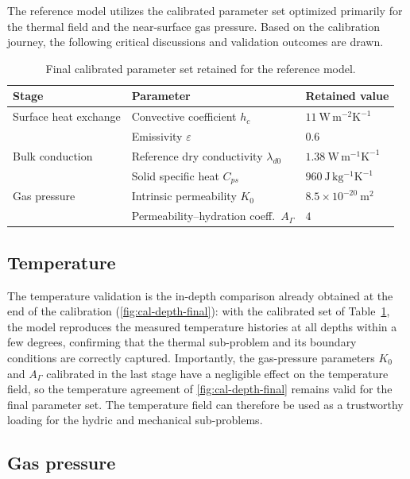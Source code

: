 The reference model utilizes the calibrated parameter set optimized primarily for the thermal field and the near-surface gas pressure. Based on the calibration journey, the following critical discussions and validation outcomes are drawn.

\begin{table}[H]
  \centering
  \caption{Final calibrated parameter set retained for the reference model.}
  \label{tab:calibrated}
  \begin{tabular}{lll}
    \hline
    Stage & Parameter & Retained value \\
    \hline
    Surface heat exchange & Convective coefficient $h_c$        & $11~\mathrm{W\,m^{-2}K^{-1}}$ \\
                          & Emissivity $\varepsilon$            & $0.6$ \\
    Bulk conduction       & Reference dry conductivity $\lambda_{d0}$ & $1.38~\mathrm{W\,m^{-1}K^{-1}}$ \\
                          & Solid specific heat $C_{ps}$        & $960~\mathrm{J\,kg^{-1}K^{-1}}$ \\
    Gas pressure          & Intrinsic permeability $K_0$        & $8.5\times10^{-20}~\mathrm{m^2}$ \\
                          & Permeability--hydration coeff.\ $A_\Gamma$ & $4$ \\
    \hline
  \end{tabular}
\end{table}


\subsection{Temperature} \label{sec:val-temp}
The temperature validation is the in-depth comparison already obtained at the end of the calibration (\cref{fig:cal-depth-final}): with the calibrated set of Table~\ref{tab:calibrated}, the model reproduces the measured temperature histories at all depths within a few degrees, confirming that the thermal sub-problem and its boundary conditions are correctly captured. Importantly, the gas-pressure parameters $K_0$ and $A_\Gamma$ calibrated in the last stage have a negligible effect on the temperature field, so the temperature agreement of \cref{fig:cal-depth-final} remains valid for the final parameter set. The temperature field can therefore be used as a trustworthy loading for the hydric and mechanical sub-problems.

\subsection{Gas pressure} \label{sec:val-pressure}
 

